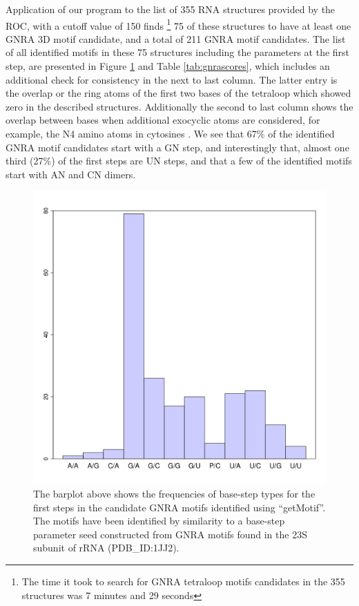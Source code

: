 Application of our program to  the list of 355 RNA structures provided
by the  ROC, with a  cutoff value of  150 finds \footnote{The  time it
  took  to search  for GNRA  tetraloop  motifs candidates  in the  355
  structures was 7  minutes and 29 seconds} 75  of these structures to
have at  least one GNRA  3D motif candidate,  and a total of  211 GNRA
motif  candidates.  The  list of  all  identified motifs  in these  75
structures including  the parameters at the first  step, are presented
in  Figure \ref{fig:steptype}  and  Table \ref{tab:gnrascores},  which
includes  an additional  check for  consistency  in the  next to  last
column.  The  latter entry  is the  overlap or the  ring atoms  of the
first two  bases of the tetraloop  which showed zero  in the described
structures.  Additionally the second  to last column shows the overlap
between  bases when  additional  exocyclic atoms  are considered,  for
example, the N4  amino atoms in cytosines \cite{lu2003}.   We see that
67\% of the identified GNRA motif candidates start with a GN step, and
interestingly that, almost one third  (27\%) of the first steps are UN
steps, and  that a few of the  identified motifs start with  AN and CN
dimers.

\begin{figure}
\centering
\includegraphics[angle=0, scale=0.5]{Chapter5/steptypesdist.png}
\caption{The barplot  above shows  the frequencies of  base-step types
  for the  first steps in  the candidate GNRA motifs  identified using
  ``getMotif''.  The  motifs have been  identified by similarity  to a
  base-step parameter seed constructed  from GNRA motifs found in the
  23S subunit of rRNA (PDB\_ID:1JJ2).}
\label{fig:steptype}
\end{figure}

